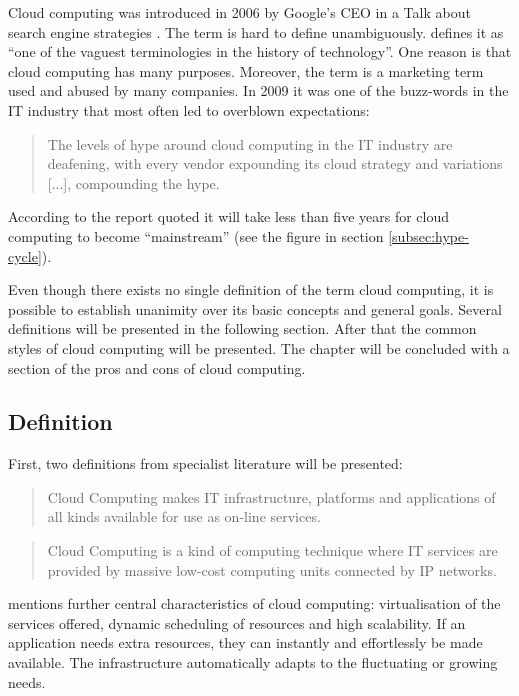 Cloud computing was introduced in 2006 by Google's CEO in a Talk about search engine strategies \cite{cloud:transcript}. The term is hard to define unambiguously.  defines it as \enquote{one of the vaguest terminologies in the history of technology}. One reason is that cloud computing has many purposes. Moreover, the term is a marketing term used and abused by many companies. In 2009 it was one of the buzz-words in the IT industry that most often led to overblown expectations:

\begin{quote}
The levels of hype around cloud computing in the IT industry are deafening, with every vendor expounding its cloud strategy and variations [...], compounding the hype. \cite{cloud:hypecycle}
\end{quote}

According to the report quoted it will take less than five years for cloud computing to become \enquote{mainstream} (see the figure in section \ref{subsec:hype-cycle}).

Even though there exists no single definition of the term cloud computing, it is possible to establish unanimity over its basic concepts and general goals. Several definitions will be presented in the following section. After that the common styles of cloud computing will be presented. The chapter will be concluded with a section of the pros and cons of cloud computing.


\subsection{Definition}

First, two definitions from specialist literature will be presented:

\begin{quote}
Cloud Computing makes IT infrastructure, platforms and applications of all kinds available for use as on-line services. 
\end{quote}
 
\begin{quote}
Cloud Computing is a kind of computing technique where IT services are provided by massive low-cost computing units connected by IP networks. 
\end{quote}


 mentions further central characteristics of cloud computing: virtualisation of the services offered, dynamic scheduling of resources and high scalability. If an application needs extra resources, they can instantly and effortlessly be made available. The infrastructure automatically adapts to the fluctuating or growing needs.

